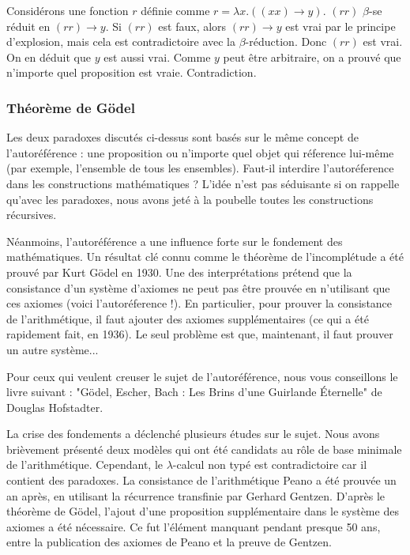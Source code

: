 {\footnotesize
	Considérons une fonction $r$ définie comme $r=\lambda x.((x x) \to y)$.
	$(r r)$ $\beta$-se réduit en $(r r) \to y$.
	Si $(r r)$ est faux, alors $(r r) \to y$ est vrai par le principe d'explosion, mais cela est contradictoire avec la $\beta$-réduction.
	Donc $(r r)$ est vrai.
	On en déduit que $y$ est aussi vrai.
	Comme $y$ peut être arbitraire, on a prouvé que n'importe quel proposition est vraie.
	Contradiction.
}

\subsubsection*{Théorème de Gödel}
Les deux paradoxes discutés ci-dessus sont basés sur le même concept de l'autoréférence : une proposition ou n'importe quel objet qui réference lui-même (par exemple, l'ensemble de tous les ensembles).
Faut-il interdire l'autoréference dans les constructions mathématiques ?
L'idée n'est pas séduisante si on rappelle qu'avec les paradoxes, nous avons jeté à la poubelle toutes les constructions récursives.

Néanmoins, l'autoréférence a une influence forte sur le fondement des mathématiques.
Un résultat clé connu comme le théorème de l'incomplétude a été prouvé par Kurt Gödel en 1930.
Une des interprétations prétend que la consistance d'un système d'axiomes ne peut pas être prouvée en n'utilisant que ces axiomes (voici l'autoréference !). En particulier, pour prouver la consistance de l'arithmétique, il faut ajouter des axiomes supplémentaires (ce qui a été rapidement fait, en 1936). Le seul problème est que, maintenant, il faut prouver un autre système...

{\footnotesize
	Pour ceux qui veulent creuser le sujet de l'autoréférence, nous vous conseillons le livre suivant : "Gödel, Escher, Bach : Les Brins d'une Guirlande Éternelle" de Douglas Hofstadter.
}

La crise des fondements a déclenché plusieurs études sur le sujet.
Nous avons brièvement présenté deux modèles qui ont été candidats au rôle de base minimale de l'arithmétique.
Cependant, le $\lambda$-calcul non typé est contradictoire car il contient des paradoxes.
La consistance de l'arithmétique Peano a été prouvée un an après, en utilisant la récurrence transfinie par Gerhard Gentzen.
D'après le théorème de Gödel, l'ajout d'une proposition supplémentaire dans le système des axiomes a été nécessaire.
Ce fut l'élément manquant pendant presque 50 ans, entre la publication des axiomes de Peano et la preuve de Gentzen.

